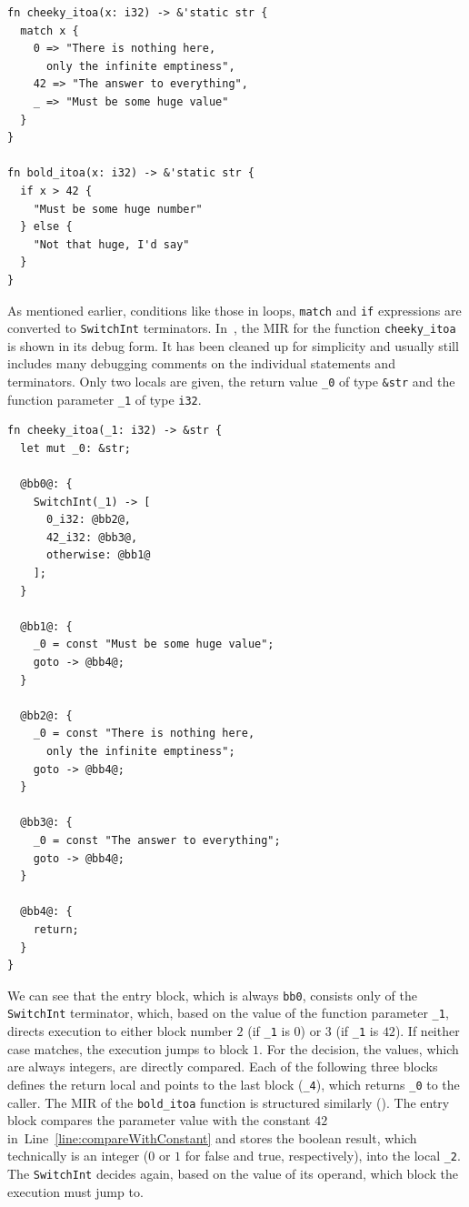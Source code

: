 \documentclass[paper=a4,%
  twoside,%
  BCOR4mm,%
  abstract=true,%
  toc=bibliography,%
  chapterprefix=true,%
  toc=bibliographynumbered,%
  open=right,%
  english,%
  pagesize=pdftex]{scrreprt}
\newcommand{\hir}{\ac{HIR}\xspace}
\newcommand{\mir}{\ac{MIR}\xspace}
\begin{document}
\begin{lstlisting}[style=boxed, caption={\hir of the code in \Cref{lst:hir-lowering}}, label=lst:mir-lowering-example]
fn cheeky_itoa(x: i32) -> &'static str {
  match x {
    0 => "There is nothing here,
      only the infinite emptiness",
    42 => "The answer to everything",
    _ => "Must be some huge value"
  }
}

fn bold_itoa(x: i32) -> &'static str {
  if x > 42 {
    "Must be some huge number"
  } else {
    "Not that huge, I'd say"
  }
}
\end{lstlisting}

As mentioned earlier, conditions like those in loops, \texttt{match} and \texttt{if} expressions are converted to \texttt{SwitchInt} terminators. In~, the \mir for the function \texttt{cheeky\string_itoa} is shown in its debug form. It has been cleaned up for simplicity and usually still includes many debugging comments on the individual statements and terminators. Only two locals are given, the return value \texttt{\string_0} of type \texttt{\string&str}
and the function parameter \texttt{\string_1} of type \texttt{i32}.

\begin{lstlisting}[language={MIR}, style=boxed, caption={\mir of the \texttt{cheeky\string_itoa} function}, label=lst:mir-lowered-first]
fn cheeky_itoa(_1: i32) -> &str {
  let mut _0: &str;

  @bb0@: {
    SwitchInt(_1) -> [
      0_i32: @bb2@,
      42_i32: @bb3@,
      otherwise: @bb1@
    ];
  }

  @bb1@: {
    _0 = const "Must be some huge value";
    goto -> @bb4@;
  }

  @bb2@: {
    _0 = const "There is nothing here,
      only the infinite emptiness";
    goto -> @bb4@;
  }

  @bb3@: {
    _0 = const "The answer to everything";
    goto -> @bb4@;
  }

  @bb4@: {
    return;
  }
}
\end{lstlisting}

We can see that the entry block, which is always \texttt{bb0}, consists only of the \texttt{SwitchInt} terminator, which, based on the value of the function parameter \texttt{\string_1}, directs execution to either block number $2$ (if \texttt{\string_1} is $0$) or $3$ (if \texttt{\string_1} is $42$). If neither case matches, the execution jumps to block $1$. For the decision, the values, which are always integers, are directly compared. Each of the following three blocks defines the return local and points to the last block (\texttt{\string_4}), which returns \texttt{\string_0} to the caller. The \mir of the \texttt{bold\string_itoa} function is structured similarly (). The entry block compares the parameter value with the constant $42$ in~Line~\ref{line:compareWithConstant} and stores the boolean result, which technically is an integer ($0$ or $1$ for false and true, respectively), into the local \texttt{\string_2}. The \texttt{SwitchInt} decides again, based on the value of its operand, which block the execution must jump to.
\end{document}
